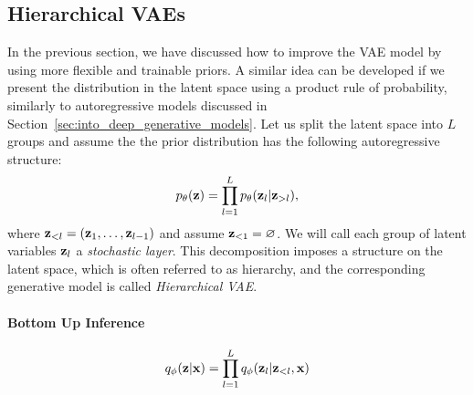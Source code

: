 \subsection{Hierarchical VAEs}
In the previous section, we have discussed how to improve the VAE model by using more flexible and trainable priors.
A similar idea can be developed if we present the distribution in the latent space using a product rule of probability, similarly to autoregressive models discussed in Section~\ref{sec:into_deep_generative_models}. Let us split the latent space into $L$ groups and assume the the prior distribution has the following autoregressive structure:
\begin{equation}
    p_{\theta}({\mathbf{z}}) = \prod_{l=1}^L p_{\theta}({\mathbf{z}}_l|{\mathbf{z}}_{>l}),
\end{equation}
where ${\mathbf{z}}_{<l} = ({\mathbf{z}}_1, \dots, {\mathbf{z}}_{l-1})$ and assume ${\mathbf{z}}_{<1} = \varnothing$. We will call each group of latent variables ${\mathbf{z}}_l$ a \textit{stochastic layer}. This decomposition imposes a structure on the latent space, which is often referred to as hierarchy, and the corresponding generative model is called \textit{Hierarchical VAE}. 

\paragraph{Bottom Up Inference}

\begin{equation}
    q_{\phi}({\mathbf{z}}|{\mathbf{x}}) = \prod_{l=1}^L q_{\phi}({\mathbf{z}}_l|{\mathbf{z}}_{<l}, {\mathbf{x}})
\end{equation}

